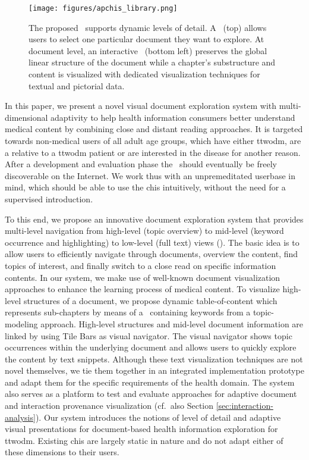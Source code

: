 \begin{figure*}[ht!]
    \centering
    \texttt{[image: figures/apchis\_library.png]}
    \caption{
    The proposed \apluschis\ supports dynamic levels of detail. 
    A \DocumentLibrary\ (top) allows users to select one particular document they want to explore. 
    At document level, an interactive \TableOfContents\ (bottom left) preserves the global linear structure of the document while a chapter's substructure and content is visualized with dedicated visualization techniques for textual and pictorial data.
    }
    \label{fig:concept-dl-and-toc}
\end{figure*}

In this paper, we present a novel visual document exploration system with multi-dimensional adaptivity to help health information consumers better understand medical content by combining close and distant reading approaches.
%
It is targeted towards non-medical users of all adult age groups, which have either \acrshort{ttwodm}, are a relative to a \acrshort{ttwodm} patient or are interested in the disease for another reason. 
%
After a development and evaluation phase the \apluschis\ should  eventually be freely discoverable on the Internet. 
%
We work thus with an unpremeditated userbase in mind, which should be able to use the \acrshort{chis} intuitively, without the need for a supervised introduction. 

To this end, we propose an innovative document exploration system that provides multi-level navigation from high-level (topic overview) to mid-level (keyword occurrence and highlighting) to low-level (full text) views (). 
%
The basic idea is to allow users to efficiently navigate through documents, overview the content, find topics of interest, and finally switch to a close read on specific information contents. 
%
In our system, we make use of well-known document visualization approaches to enhance the learning process of medical content. To visualize high-level structures of a document, we propose dynamic table-of-content which represents sub-chapters by means of a \WordCloud\ containing keywords from a topic-modeling approach. High-level structures and mid-level document information are linked by using Tile Bars as visual navigator. 
%
The visual navigator shows topic occurrences within the underlying document and allows users to quickly explore the content by text snippets.
%
Although these text visualization techniques are not novel themselves, we tie them together in an integrated implementation prototype and adapt them for the specific requirements of the health domain. The system also serves as a platform to test and evaluate approaches for adaptive document and interaction provenance visualization (cf.\ also Section \ref{sec:interaction-analysis}).
%
Our system introduces the notions of  level of detail and adaptive visual presentations for document-based health information exploration for \acrshort{ttwodm}. 
%
Existing \acrshort{chis} are largely static in nature and do not adapt either of these dimensions to their users.


